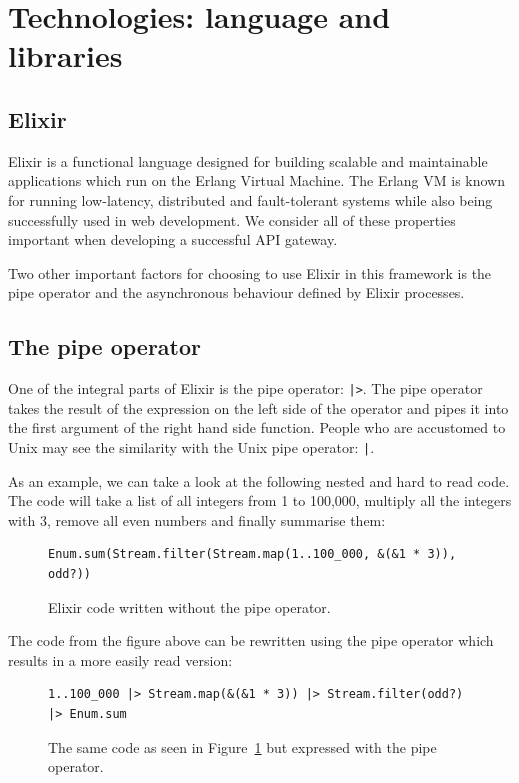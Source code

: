 \documentclass{cslthse-msc}
\begin{document}
\section{Technologies: language and libraries}
\subsection{Elixir}
Elixir is a functional language designed for building scalable and maintainable applications which run on the Erlang Virtual Machine. The Erlang VM is known for running low-latency, distributed and fault-tolerant systems while also being successfully used in web development\cite{elixir}. We consider all of these properties important when developing a successful API gateway.

Two other important factors for choosing to use Elixir in this framework is the pipe operator and the asynchronous behaviour defined by Elixir processes.

\subsection{The pipe operator}
One of the integral parts of Elixir is the pipe operator: \lstinline{|>}. The pipe operator takes the result of the expression on the left side of the operator and pipes it into the first argument of the right hand side function. People who are accustomed to Unix may see the similarity with the Unix pipe operator: \lstinline{|}.

\vspace{5mm}

\noindent As an example, we can take a look at the following nested and hard to read code. The code will take a list of all integers from 1 to 100,000, multiply all the integers with 3, remove all even numbers and finally summarise them:

\begin{figure}[H]
  \centering
\begin{lstlisting}[breaklines=true,frame=single]
Enum.sum(Stream.filter(Stream.map(1..100_000, &(&1 * 3)), odd?))
\end{lstlisting}
  \caption{Elixir code written without the pipe operator.}
  \label{fig:no_pipe}
\end{figure}

\noindent The code from the figure above can be rewritten using the pipe operator which results in a more easily read version:

\begin{figure}[H]
  \centering
\begin{lstlisting}[breaklines=true,frame=single]
1..100_000 |> Stream.map(&(&1 * 3)) |> Stream.filter(odd?) |> Enum.sum
\end{lstlisting}
  \caption{The same code as seen in Figure~\ref{fig:no_pipe} but expressed with the pipe operator.}
\end{figure}
\end{document}
